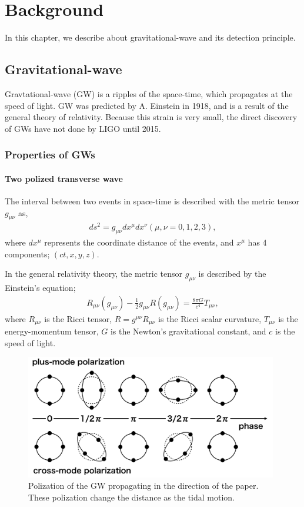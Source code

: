 \chapter{Background}
In this chapter, we describe about gravitational-wave and its detection principle.

\section{Gravitational-wave} \label{sec:sec11}
Gravtational-wave (GW) is a ripples of the space-time, which propagates at the speed of light. GW was predicted by A. Einstein in 1918, and is a result of the general theory of relativity. Because this strain is very small, the direct discovery of GWs have not done by LIGO until 2015.

\subsection{Properties of GWs} 
\subsubsection{Two polized transverse wave}
The interval between two events in space-time is
described with the metric tensor $g_{\mu\nu}$ as, 
\begin{eqnarray}
  d s^{2}=g_{\mu \nu} d x^{\mu} d x^{\nu} (\mu,\nu = 0,1,2,3),
\end{eqnarray}
where $dx^{\mu}$ represents the coordinate distance of the events, and $x^{\mu}$ has 4 components; $(ct,x,y,z)$.

In the general relativity theory\cite{einstein1916vd}, the metric tensor $g_{\mu\nu}$ is described by the Einstein's equation;
\begin{eqnarray}
  R_{\mu \nu}\left(g_{\mu \nu}\right)-\frac{1}{2} g_{\mu \nu} R\left(g_{\mu \nu}\right)=\frac{8 \pi G}{c^{4}} T_{\mu \nu},
\end{eqnarray}
where $R_{\mu\nu}$ is the Ricci tensor, $R=g^{\mu \nu} R_{\mu \nu}$ is the Ricci scalar curvature, $T_{\mu\nu}$ is the energy-momentum tensor, $G$ is the Newton's gravitational constant, and $c$ is the speed of light.

\begin{figure}[t]
  \begin{center}   
    \includegraphics[width=11.0cm]{./img_chap1/img131.png}
    \caption[Polization of the GW]{Polization of the GW propagating in the direction of the paper. These polization change the distance as the tidal motion.
}\label{img:img131}
  \end{center}
\end{figure}

